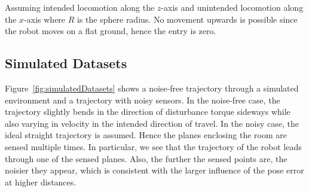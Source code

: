 Assuming intended locomotion along the $z$-axis and unintended locomotion along the $x$-axis where $R$ is the sphere radius.
No movement upwards is possible since the robot moves on a flat ground, hence the entry is zero.

\subsection{Simulated Datasets}

Figure~\ref{fig:simulatedDatasets} shows a noise-free trajectory through a simulated environment and a trajectory with noisy sensors.
In the noise-free case, the trajectory slightly bends in the direction of disturbance torque sideways while also varying in velocity in the intended direction of travel.
In the noisy case, the ideal straight trajectory is assumed.
Hence the planes enclosing the room are sensed multiple times. 
In particular, we see that the trajectory of the robot leads through one of the sensed planes. 
Also, the further the sensed points are, the noisier they appear, which is consistent with the larger influence of the pose error at higher distances.  

